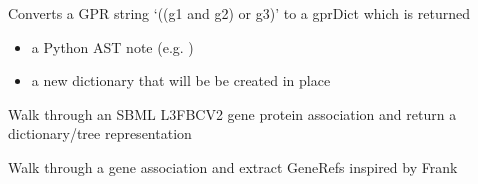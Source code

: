 \documentclass[letterpaper,10pt,english]{sphinxmanual}
\begin{document}
\begin{fulllineitems}
\label{\detokenize{modules_doc:cbmpy.CBXML.sbml_getGPRasDictFBCv1}}
\pysigstartsignatures
{}
\pysigstopsignatures
\sphinxAtStartPar
Converts a GPR string ‘((g1 and g2) or g3)’ to a gprDict which is returned
\begin{itemize}
\item {} 
\sphinxAtStartPar
{} a Python AST note (e.g. )

\item {} 
\sphinxAtStartPar
{} a new dictionary that will be be created in place

\end{itemize}

\end{fulllineitems}


\begin{fulllineitems}
\label{\detokenize{modules_doc:cbmpy.CBXML.sbml_getGPRasDictFBCv2}}
\pysigstartsignatures
{}
\pysigstopsignatures
\sphinxAtStartPar
Walk through an SBML L3FBCV2 gene protein association and return a dictionary/tree representation

\end{fulllineitems}


\begin{fulllineitems}
\label{\detokenize{modules_doc:cbmpy.CBXML.sbml_getGeneRefs}}
\pysigstartsignatures
{}
\pysigstopsignatures
\sphinxAtStartPar
Walk through a gene association and extract GeneRefs inspired by Frank

\end{fulllineitems}
\end{document}

